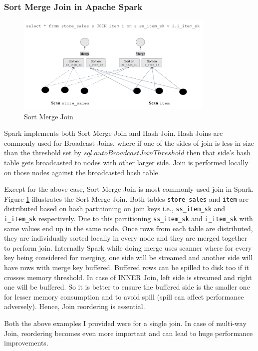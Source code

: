 \subsubsection{Sort Merge Join in Apache Spark}\label{subsubsec:sparkjoin}

\begin{figure}[ht]
    \centerline{\includegraphics[width=9.5cm]{fig/SortMergeJoin.png}}
    \caption{Sort Merge Join}
    \label{sort_merge_join}
\end{figure}

Spark implements both Sort Merge Join and Hash Join.
Hash Joins are commonly used for Broadcast Joins, where if one of the sides of join is less in size than the threshold set by \texttt{$sql.autoBroadcastJoinThreshold$} then that side's hash table gets broadcasted to nodes with other larger side.
Join is performed locally on those nodes against the broadcasted hash table.

Except for the above case, Sort Merge Join is most commonly used join in Spark. Figure \ref{sort_merge_join} illustrates the Sort Merge Join.
Both tables \texttt{store\_sales} and \texttt{item} are distributed based on hash partitioning on join keys i.e., \texttt{ss\_item\_sk} and \texttt{i\_item\_sk} respectively. Due to this partitioning \texttt{ss\_item\_sk}  and \texttt{i\_item\_sk} with same values end up in the same node. Once rows from each table are distributed, they are individually sorted locally in every node and they are merged together to perform join. Internally Spark while doing merge uses scanner where for every key being considered for merging, one side will be streamed and another side will have rows with merge key buffered. Buffered rows can be spilled to disk too if it crosses memory threshold. In case of INNER Join, left side is streamed and right one will be buffered. So it is better to ensure the buffered side is the smaller one for lesser memory consumption and to avoid spill (spill can affect performance adversely). Hence, Join reordering is essential.

Both the above examples I provided were for a single join. In case of multi-way Join, reordering becomes even more important and can lead to huge performance improvements.
